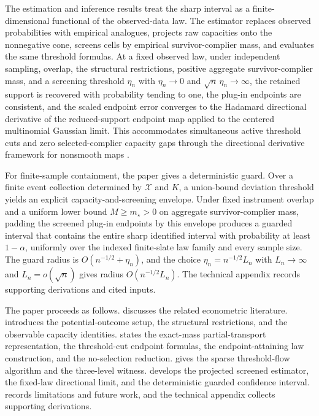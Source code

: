 \documentclass[11pt]{article}
\begin{document}
The estimation and inference results treat the sharp interval as a finite-dimensional functional of the observed-data law.  The estimator replaces observed probabilities with empirical analogues, projects raw capacities onto the nonnegative cone, screens cells by empirical survivor-complier mass, and evaluates the same threshold formulas.  At a fixed observed law, under independent sampling, overlap, the structural restrictions, positive aggregate survivor-complier mass, and a screening threshold \(\eta_n\) with \(\eta_n\to0\) and \(\sqrt n\,\eta_n\to\infty\), the retained support is recovered with probability tending to one, the plug-in endpoints are consistent, and the scaled endpoint error converges to the Hadamard directional derivative of the reduced-support endpoint map applied to the centered multinomial Gaussian limit.  This accommodates simultaneous active threshold cuts and zero selected-complier capacity gaps through the directional derivative framework for nonsmooth maps \citep{vanDerVaart1998,FangSantos2019,HongLi2018}.

For finite-sample containment, the paper gives a deterministic guard.  Over a finite event collection determined by \(\mathcal X\) and \(K\), a union-bound deviation threshold yields an explicit capacity-and-screening envelope.  Under fixed instrument overlap and a uniform lower bound \(M\ge m_\star>0\) on aggregate survivor-complier mass, padding the screened plug-in endpoints by this envelope produces a guarded interval that contains the entire sharp identified interval with probability at least \(1-\alpha\), uniformly over the indexed finite-slate law family and every sample size.  The guard radius is \(O(n^{-1/2}+\eta_n)\), and the choice \(\eta_n=n^{-1/2}L_n\) with \(L_n\to\infty\) and \(L_n=o(\sqrt n)\) gives radius \(O(n^{-1/2}L_n)\).  The technical appendix records supporting derivations and cited inputs.

The paper proceeds as follows.   discusses the related econometric literature.   introduces the potential-outcome setup, the structural restrictions, and the observable capacity identities.   states the exact-mass partial-transport representation, the threshold-cut endpoint formulas, the endpoint-attaining law construction, and the no-selection reduction.   gives the sparse threshold-flow algorithm and the three-level witness.   develops the projected screened estimator, the fixed-law directional limit, and the deterministic guarded confidence interval.   records limitations and future work, and the technical appendix collects supporting derivations.
\end{document}
